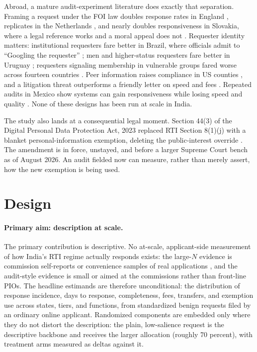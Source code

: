 \documentclass[11pt]{article}
\begin{document}
Abroad, a mature audit-experiment literature does exactly that separation. Framing a request under the FOI law doubles response rates in England \citep{worthy2017}, replicates in the Netherlands \citep{grimmelikhuijsen2019}, and nearly doubles responsiveness in Slovakia, where a legal reference works and a moral appeal does not \citep{spac2018}. Requester identity matters: institutional requesters fare better in Brazil, where officials admit to ``Googling the requester'' \citep{michener2020}; men and higher-status requesters fare better in Uruguay \citep{pineiro2018}; requesters signaling membership in vulnerable groups fared worse across fourteen countries \citep{osji2006}. Peer information raises compliance in US counties \citep{benaaron2017}, and a litigation threat outperforms a friendly letter on speed and fees \citep{cuillier2010}. Repeated audits in Mexico show systems can gain responsiveness while losing speed and quality \citep{lagunes2019, berliner2018}. None of these designs has been run at scale in India.

The study also lands at a consequential legal moment. Section 44(3) of the Digital Personal Data Protection Act, 2023 replaced RTI Section 8(1)(j) with a blanket personal-information exemption, deleting the public-interest override \citep{dpdp2023}. The amendment is in force, unstayed, and before a larger Supreme Court bench as of August 2026. An audit fielded now can measure, rather than merely assert, how the new exemption is being used.

\section{Design}
\label{sec:design}

\paragraph{Primary aim: description at scale.} The primary contribution is descriptive. No at-scale, applicant-side measurement of how India's RTI regime actually responds exists: the large-$N$ evidence is commission self-reports \citep{sns2025} or convenience samples of real applications \citep{raag2009, raag2014, pria2008}, and the audit-style evidence is small or aimed at the commissions rather than front-line PIOs. The headline estimands are therefore unconditional: the distribution of response incidence, days to response, completeness, fees, transfers, and exemption use across states, tiers, and functions, from standardized benign requests filed by an ordinary online applicant. Randomized components are embedded only where they do not distort the description: the plain, low-salience request is the descriptive backbone and receives the larger allocation (roughly 70 percent), with treatment arms measured as deltas against it.
\end{document}
